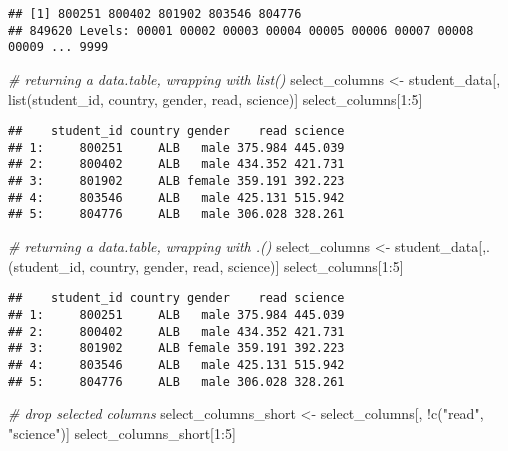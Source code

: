 \documentclass[
]{article}
\newenvironment{Shaded}{\begin{snugshade}}{\end{snugshade}}
\newcommand{\CommentTok}[1]{\textcolor[rgb]{0.56,0.35,0.01}{\textit{#1}}}
\newcommand{\DecValTok}[1]{\textcolor[rgb]{0.00,0.00,0.81}{#1}}
\newcommand{\FunctionTok}[1]{\textcolor[rgb]{0.00,0.00,0.00}{#1}}
\newcommand{\NormalTok}[1]{#1}
\newcommand{\OtherTok}[1]{\textcolor[rgb]{0.56,0.35,0.01}{#1}}
\newcommand{\SpecialCharTok}[1]{\textcolor[rgb]{0.00,0.00,0.00}{#1}}
\newcommand{\StringTok}[1]{\textcolor[rgb]{0.31,0.60,0.02}{#1}}
\begin{document}
\begin{verbatim}
## [1] 800251 800402 801902 803546 804776
## 849620 Levels: 00001 00002 00003 00004 00005 00006 00007 00008 00009 ... 9999
\end{verbatim}

\begin{Shaded}
\begin{Highlighting}[]
\CommentTok{\# returning a data.table, wrapping with list()}
\NormalTok{select\_columns }\OtherTok{\textless{}{-}}\NormalTok{ student\_data[, }\FunctionTok{list}\NormalTok{(student\_id, country, gender, read, science)]}
\NormalTok{select\_columns[}\DecValTok{1}\SpecialCharTok{:}\DecValTok{5}\NormalTok{]}
\end{Highlighting}
\end{Shaded}

\begin{verbatim}
##    student_id country gender    read science
## 1:     800251     ALB   male 375.984 445.039
## 2:     800402     ALB   male 434.352 421.731
## 3:     801902     ALB female 359.191 392.223
## 4:     803546     ALB   male 425.131 515.942
## 5:     804776     ALB   male 306.028 328.261
\end{verbatim}

\begin{Shaded}
\begin{Highlighting}[]
\CommentTok{\# returning a data.table, wrapping with .()}
\NormalTok{select\_columns }\OtherTok{\textless{}{-}}\NormalTok{ student\_data[,.(student\_id, country, gender, read, science)] }
\NormalTok{select\_columns[}\DecValTok{1}\SpecialCharTok{:}\DecValTok{5}\NormalTok{]}
\end{Highlighting}
\end{Shaded}

\begin{verbatim}
##    student_id country gender    read science
## 1:     800251     ALB   male 375.984 445.039
## 2:     800402     ALB   male 434.352 421.731
## 3:     801902     ALB female 359.191 392.223
## 4:     803546     ALB   male 425.131 515.942
## 5:     804776     ALB   male 306.028 328.261
\end{verbatim}

\begin{Shaded}
\begin{Highlighting}[]
\CommentTok{\# drop selected columns}
\NormalTok{select\_columns\_short }\OtherTok{\textless{}{-}}\NormalTok{ select\_columns[, }\SpecialCharTok{!}\FunctionTok{c}\NormalTok{(}\StringTok{"read"}\NormalTok{, }\StringTok{"science"}\NormalTok{)]}
\NormalTok{select\_columns\_short[}\DecValTok{1}\SpecialCharTok{:}\DecValTok{5}\NormalTok{]}
\end{Highlighting}
\end{Shaded}
\end{document}
